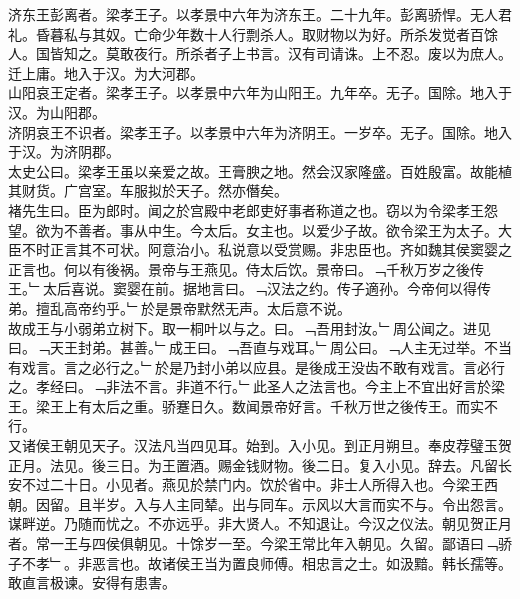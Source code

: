 \documentclass{zhvt-classic}
\begin{document}
\hspace*{2em}济东王彭离者。梁孝王子。以孝景中六年为济东王。二十九年。彭离骄悍。无人君礼。昏暮私与其奴。亡命少年数十人行剽杀人。取财物以为好。所杀发觉者百馀人。国皆知之。莫敢夜行。所杀者子上书言。汉有司请诛。上不忍。废以为庶人。迁上庸。地入于汉。为大河郡。\\
\hspace*{2em}山阳哀王定者。梁孝王子。以孝景中六年为山阳王。九年卒。无子。国除。地入于汉。为山阳郡。\\
\hspace*{2em}济阴哀王不识者。梁孝王子。以孝景中六年为济阴王。一岁卒。无子。国除。地入于汉。为济阴郡。\\
\hspace*{2em}太史公曰。梁孝王虽以亲爱之故。王膏腴之地。然会汉家隆盛。百姓殷富。故能植其财货。广宫室。车服拟於天子。然亦僭矣。\\
\hspace*{2em}褚先生曰。臣为郎时。闻之於宫殿中老郎吏好事者称道之也。窃以为令梁孝王怨望。欲为不善者。事从中生。今太后。女主也。以爱少子故。欲令梁王为太子。大臣不时正言其不可状。阿意治小。私说意以受赏赐。非忠臣也。齐如魏其侯窦婴之正言也。何以有後祸。景帝与王燕见。侍太后饮。景帝曰。﹁千秋万岁之後传王。﹂太后喜说。窦婴在前。据地言曰。﹁汉法之约。传子適孙。今帝何以得传弟。擅乱高帝约乎。﹂於是景帝默然无声。太后意不说。\\
\hspace*{2em}故成王与小弱弟立树下。取一桐叶以与之。曰。﹁吾用封汝。﹂周公闻之。进见曰。﹁天王封弟。甚善。﹂成王曰。﹁吾直与戏耳。﹂周公曰。﹁人主无过举。不当有戏言。言之必行之。﹂於是乃封小弟以应县。是後成王没齿不敢有戏言。言必行之。孝经曰。﹁非法不言。非道不行。﹂此圣人之法言也。今主上不宜出好言於梁王。梁王上有太后之重。骄蹇日久。数闻景帝好言。千秋万世之後传王。而实不行。\\
\hspace*{2em}又诸侯王朝见天子。汉法凡当四见耳。始到。入小见。到正月朔旦。奉皮荐璧玉贺正月。法见。後三日。为王置酒。赐金钱财物。後二日。复入小见。辞去。凡留长安不过二十日。小见者。燕见於禁门内。饮於省中。非士人所得入也。今梁王西朝。因留。且半岁。入与人主同辇。出与同车。示风以大言而实不与。令出怨言。谋畔逆。乃随而忧之。不亦远乎。非大贤人。不知退让。今汉之仪法。朝见贺正月者。常一王与四侯俱朝见。十馀岁一至。今梁王常比年入朝见。久留。鄙语曰﹁骄子不孝﹂。非恶言也。故诸侯王当为置良师傅。相忠言之士。如汲黯。韩长孺等。敢直言极谏。安得有患害。\\
\end{document}
